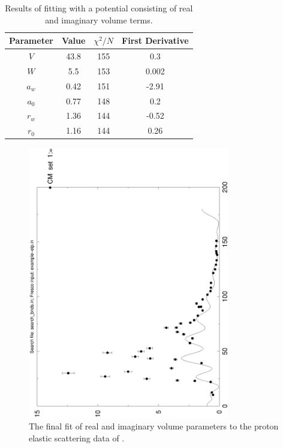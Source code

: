 \documentclass[]{scrartcl}
\begin{document}
\begin{table}
\centering
	\begin{tabular}{ c | c | c c }
	Parameter & Value & $\chi ^2 / N$ & First Derivative\\
\hline
	$V$ & 43.8 & 155 & 0.3\\
	$W$ & 5.5 & 153 & 0.002\\
	$a _w$ & 0.42 & 151 & -2.91\\
	$a _0$ & 0.77 & 148 & 0.2\\
	$r _w$ & 1.36 & 144 & -0.52\\
	$r _0$ & 1.16 & 144 & 0.26\\
\hline
	\end{tabular}
	\caption{Results of fitting with a potential consisting of real and imaginary volume terms.}
	\label{tab:fitvol}
\end{table}

\begin{figure}
\centering
	\includegraphics[width=0.78\textwidth,angle=270]{plots/searchV1.eps}
	\caption{The final fit of real and imaginary volume parameters to the proton elastic scattering data of \citep{Sinha1972}.}
	\label{fig:fit1}
\end{figure}
\end{document}
